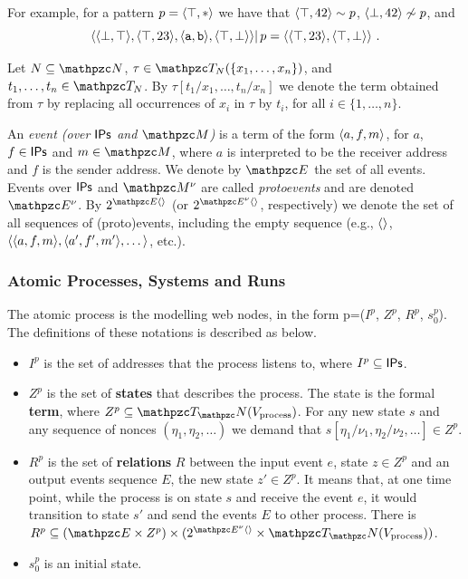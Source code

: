   For example, for a pattern $p = \langle\top,*\rangle$ we have that $\langle\top,42\rangle \sim p$, $\langle\bot,42\rangle \not\sim p$, and \[\langle\langle\bot,\top\rangle,\langle\top,23\rangle,\langle\mathtt{a},\mathtt{b}\rangle,\langle\top,\bot\rangle\rangle |\, p = \langle\langle\top,23\rangle,\langle\top,\bot\rangle\rangle\ .\]


\begin{definition}
  Let $N\subseteq \nonces$, $\tau \in \gterms_N(\{x_1,\ldots,x_n\})$,
  and $t_1,\ldots,t_n\in \gterms_N$. By
  $\tau[t_1\!/\!x_1,\ldots,t_n\!/\!x_n]$ we denote the term obtained
  from $\tau$ by replacing all occurrences of $x_i$ in $\tau$ by
  $t_i$, for all $i\in \{1,\ldots,n\}$.
\end{definition}


\begin{definition}
  An \emph{event (over $\mathsf{IPs}$ and $\messages$)} is a term of the
  form $\langle a, f, m\rangle$, for $a$, $f\in \mathsf{IPs}$ and $m \in
  \messages$, where $a$ is interpreted to be the receiver address and
  $f$ is the sender address. We denote by $\events$ the set of all
  events. Events over $\mathsf{IPs}$ and $\messages^\nu$ are called
  \emph{protoevents} and are denoted $\events^\nu$. By
  $2^{\events\an{}}$ (or $2^{\events^\nu\an{}}$, respectively) we
  denote the set of all sequences of (proto)events, including the
  empty sequence (e.g., $\langle\rangle$, $\langle\langle a, f, m\rangle, \langle a', f', m'\rangle,
    \dots\rangle$, etc.). 
\end{definition}

\subsubsection{Atomic Processes, Systems and Runs}

\begin{definition}
The atomic process is the modelling web nodes, in the form p=($I^p$, $Z^p$, $R^p$, $s_0^p$). The definitions of these notations is described as below.
\begin{itemize}
\item $I^p$ is the set of addresses that the process listens to, where $I^p \subseteq \mathsf{IPs}$.
\item  $Z^p$ is the set of \textbf{states} that describes the process. The state is the formal \textbf{term}, where $Z^p \subseteq \terms(V_{\text{process}})$. For any new state $s$ and any sequence of nonces  $(\eta_1, \eta_2, \dots)$ we demand that $s[\eta_1/\nu_1,  \eta_2/\nu_2, \dots] \in Z^p$.
\item $R^p$ is the set of \textbf{relations} $R$ between the input event $e$, state $z \in Z^p$ and an output events sequence $E$, the new state $z' \in Z^p$. It means that, at one time point, while the process is on state $s$ and receive the event $e$, it would transition to state $s'$ and send the events $E$ to other process. There is $R^p\subseteq (\events \times Z^p) \times (2^{\events^\nu\an{}}
  \times \terms(V_{\text{process}}))$. 
\item $s_0^p$ is an initial state.
\end{itemize}
\end{definition}

